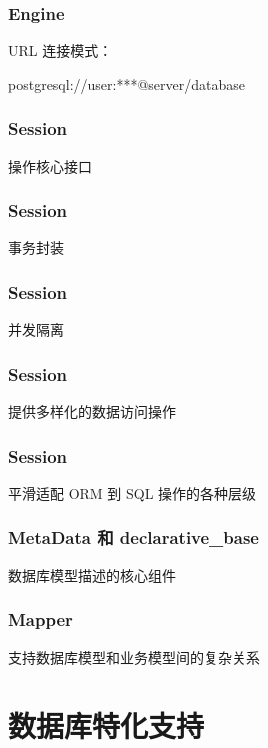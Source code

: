 \documentclass{beamer}
\begin{document}
\begin{frame}[containsverbatim]
  \frametitle{Engine}
\Large{URL 连接模式：}
  \begin{center}
    postgresql://user:***@server/database
  \end{center}
\end{frame}

\begin{frame}
  \frametitle{Session}
  \begin{center}
    \Large{操作核心接口}
  \end{center}
\end{frame}

\begin{frame}
  \frametitle{Session}
  \begin{center}
    \Large{事务封装}
  \end{center}
\end{frame}

\begin{frame}
  \frametitle{Session}
  \begin{center}
    \Large{并发隔离}
  \end{center}
\end{frame}

\begin{frame}
  \frametitle{Session}
  \begin{center}
    \Large{提供多样化的数据访问操作}
  \end{center}
\end{frame}

\begin{frame}
  \frametitle{Session}
  \begin{center}
    \Large{平滑适配 ORM 到 SQL 操作的各种层级}
  \end{center}
\end{frame}

\begin{frame}
  \frametitle{MetaData 和 declarative\_base}
  \begin{center}
    \Large{数据库模型描述的核心组件}
  \end{center}
\end{frame}

\begin{frame}
  \frametitle{Mapper}
  \begin{center}
    \Large{支持数据库模型和业务模型间的复杂关系}
  \end{center}
\end{frame}

\section{数据库特化支持}
\end{document}
